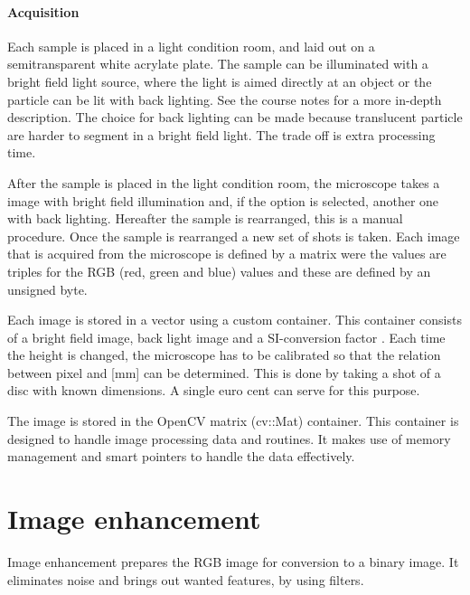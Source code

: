 \documentclass[11pt,fleqn,,a4paper,twoside,openright]{book}
\begin{document}
\paragraph{Acquisition} \label{Acquistion} Each sample is placed in a light condition room, and laid out on a semitransparent white acrylate plate. The sample can be illuminated with a bright field light source, where the light is aimed directly at an object or the particle can be lit with back lighting. See the course notes \cite{ypma_course_2014} for a more in-depth description. The choice for back lighting can be made because translucent particle are harder to segment in a bright field light. The trade off is extra processing time.

After the sample is placed in the light condition room, the microscope takes a image with bright field illumination  and, if the option is selected, another one with back lighting.  Hereafter the sample is rearranged, this is a manual procedure. Once the sample is rearranged a new set of shots is taken. Each image that is acquired from the microscope is defined by a matrix were the values are triples for the RGB  (red, green and blue) values and these are defined by an unsigned byte.

Each image is stored in a vector using a custom container. This container consists of a bright field image, back light image and a SI-conversion factor . Each time the height is changed, the microscope has to be calibrated so that the relation between pixel and [mm] can be determined. This is done by taking a shot of a disc with known dimensions. A single euro cent can serve for this purpose.

\begin{remark}
	The image is stored in the OpenCV matrix (cv::Mat) container. This container is  designed to handle image processing data and routines. It makes use of memory management and smart pointers to handle the data effectively.
\end{remark}

\section{Image enhancement}
Image enhancement prepares the RGB image for conversion to a binary image. It eliminates noise and brings out wanted features, by using filters.
\end{document}
